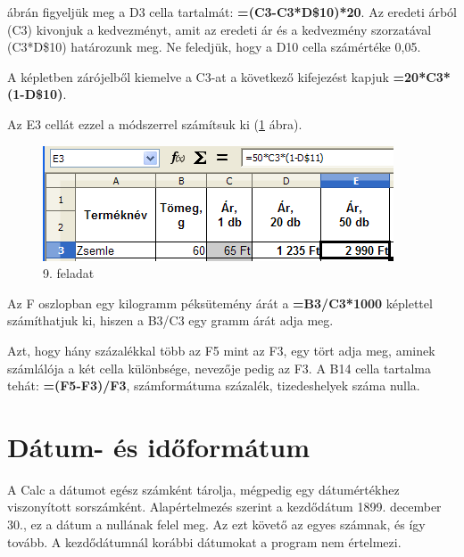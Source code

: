  ábrán figyeljük meg a D3 cella tartalmát:
\textsf{\textbf{=(C3-C3*D\$10)*20}}. Az eredeti árból (C3) kivonjuk
a kedvezményt, amit az eredeti ár és a kedvezmény szorzatával
(C3*D\$10) határozunk meg. Ne feledjük, hogy a D10 cella
számértéke 0,05.

A képletben zárójelből kiemelve a C3-at a következő
kifejezést kapjuk  \textsf{\textbf{=20*C3*(1-D\$10)}}.

Az E3 cellát ezzel a módszerrel számítsuk ki (\ref{9-feladatE3} ábra).

\begin{figure}[!h]
\begin{center}
\includegraphics[width=10.396cm]{oocalcv1-img45.png}
\caption{9. feladat}\label{9-feladatE3}
\end{center}
\end{figure}

Az F oszlopban egy kilogramm péksütemény árát a
\textsf{\textbf{=}}\textsf{\textbf{B3/C3*1000}} képlettel
számíthatjuk ki, hiszen a B3/C3 egy gramm árát adja meg.

Azt, hogy hány százalékkal több az F5 mint az F3, egy tört
adja meg, aminek számlálója a két cella különbsége,
nevezője pedig az F3. A B14 cella tartalma tehát:
\textsf{\textbf{=(F5-F3)/F3}}, számformátuma százalék,
tizedeshelyek száma nulla.


\section{Dátum- és időformátum}

A Calc a dátumot egész számként tárolja, mégpedig egy
dátumértékhez viszonyított sorszámként. Alapértelmezés
szerint a kezdődátum 1899. december 30., ez a dátum a
nullának felel meg. Az ezt követő az egyes számnak, és
így tovább. A kezdődátumnál korábbi dátumokat a program
nem értelmezi.


